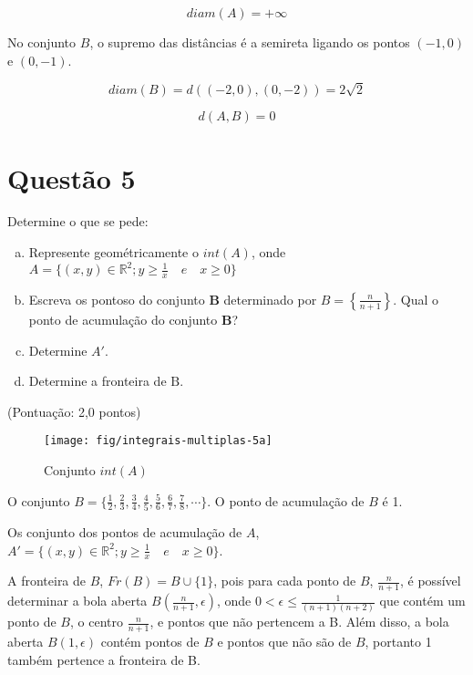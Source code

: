 \documentclass[10pt,a4paper]{article}
\begin{document}
	\begin{equation}
		diam(A) = +\infty
	\end{equation}
	
	No conjunto $B$, o supremo das distâncias é a semireta ligando os pontos $(-1, 0)$ e $(0, -1)$.
	
	\begin{equation}
		diam(B) = d((-2, 0), (0, -2)) = 2\sqrt{2}
	\end{equation}
	
	\begin{equation}
		d(A, B) = 0
	\end{equation}
	
	\section*{Questão 5}
	
	Determine o que se pede:
	
	\begin{enumerate}[a)]
		\item Represente geométricamente o $int(A)$, onde $A = \{ (x, y) \in \mathbb{R}^2; y \ge \frac{1}{x} \quad e \quad x \ge 0\}$
		\item Escreva os pontoso do conjunto $\textbf{B}$ determinado por $B = \left\{ \frac{n}{n+1}\right\} $. Qual o ponto de acumulação do conjunto \textbf{B}?
		\item Determine $A'$.
		\item Determine a fronteira de $\text{B}$.
	\end{enumerate}
	(Pontuação: 2,0 pontos)
	
	\begin{figure}[H]
		\centering
		\texttt{[image: fig/integrais-multiplas-5a]}
		\caption{Conjunto $ int(A) $}
		\label{fig:integrais-multiplas-5a}
	\end{figure}
	
	O conjunto $ B = \{ \frac{1}{2}, \frac{2}{3}, \frac{3}{4}, \frac{4}{5}, \frac{5}{6}, \frac{6}{7}, \frac{7}{8}, \cdots \} $. O ponto de acumulação de $B$ é 1.
	
	Os conjunto dos pontos de acumulação de $A$, $A' = \{(x, y) \in \mathbb{R}^2; y \ge \frac{1}{x} \quad e \quad x \ge 0 \} $.
	
	A fronteira de $B$, $Fr(B) = B \cup \{1\} $, pois para cada ponto de $B$, $\frac{n}{n+1}$, é possível determinar a bola aberta $B \left( \frac{n}{n+1}, \epsilon \right)$, onde $0 < \epsilon \le \frac{1}{(n+1)(n+2)} $ que contém um ponto de $B$, o centro $\frac{n}{n+1}$, e pontos que não pertencem a B. Além disso, a bola aberta $ B \left(1, \epsilon \right) $ contém pontos de $B$ e pontos que não são de $B$, portanto 1 também pertence a fronteira de B.
	
\end{document}
